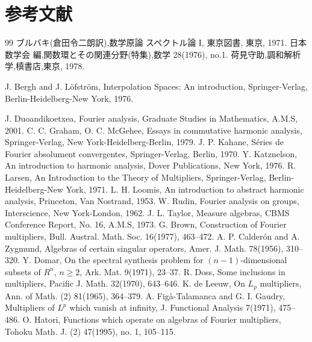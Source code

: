 \section*{参考文献}
\begin{thebibliography}{99}
 ブルバキ(倉田令二朗訳),数学原論 スペクトル論 I, 東京図書, 東京, 1971.
 日本数学会 編,関数環とその関連分野(特集),数学 28(1976), no.1.
 荷見守助,調和解析学,槙書店,東京, 1978.
\begin{sloppypar}
 J. Bergh and J. Löfström, Interpolation Spaces: An introduction, Springer-Verlag, Berlin-Heidelberg-New York, 1976.
\end{sloppypar}
 J. Duoandikoetxea, Fourier analysis, Graduate Studies in Mathematics, A.M.S, 2001.
 C. C. Graham, O. C. McGehee, Essays in commutative harmonic analysis, Springer-Verlag, New York-Heidelberg-Berlin, 1979.
 J. P. Kahane, Séries de Fourier absolument convergentes, Springer-Verlag, Berlin, 1970.
 Y. Katznelson, An introduction to harmonic analysis, Dover Publications, New York, 1976.
 R. Larsen, An Introduction to the Theory of Multipliers, Springer-Verlag, Berlin-Heidelberg-New York, 1971.
 L. H. Loomis, An introduction to abstract harmonic analysis, Princeton, Van Nostrand, 1953.
 W. Rudin, Fourier analysis on groups, Interscience, New York-London, 1962.
 J. L. Taylor, Measure algebras, CBMS Conference Report, No. 16, A.M.S, 1973.
 G. Brown, Construction of Fourier multipliers, Bull. Austral. Math. Soc. 16(1977), 463--472.
 A. P. Calderón and A. Zygmund, Algebras of certain singular operators, Amer. J. Math. 78(1956), 310--320.
 Y. Domar, On the spectral synthesis problem for $(n-1)$-dimensional subsets of $R^{n}$, $n \geq 2$, Ark. Mat. 9(1971), 23--37.
 R. Doss, Some inclusions in multipliers, Pacific J. Math. 32(1970), 643--646.
 K. de Leeuw, On $L_{p}$ multipliers, Ann. of Math. (2) 81(1965), 364--379.
 A. Figà-Talamanca and G. I. Gaudry, Multipliers of $L^{p}$ which vanish at infinity, J. Functional Analysis 7(1971), 475--486.
 O. Hatori, Functions which operate on algebras of Fourier multipliers, Tohoku Math. J. (2) 47(1995), no. 1, 105--115.

\end{thebibliography}

